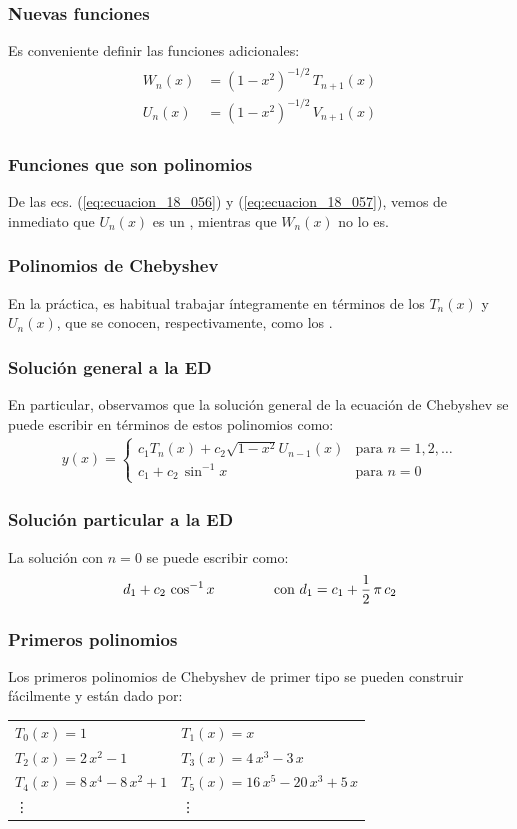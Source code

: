 \documentclass[12pt]{beamer}
\begin{document}
\begin{frame}
\frametitle{Nuevas funciones}
Es conveniente definir las funciones adicionales:
\pause
\begin{align}
\begin{aligned}
W_{n} (x) &= (1 - x^{2})^{-1/2} \, T_{n+1} (x) \\[0.5em]
U_{n} (x) &= (1 - x^{2})^{-1/2} \, V_{n+1} (x)
\end{aligned}
\label{eq:ecuacion_18_058}
\end{align}
\end{frame}
\begin{frame}
\frametitle{Funciones que son polinomios}
De las ecs. (\ref{eq:ecuacion_18_056}) y (\ref{eq:ecuacion_18_057}), vemos de inmediato que $U_{n}(x)$ es un , mientras que $W_{n}(x)$ no lo es.
\end{frame}
\begin{frame}
\frametitle{Polinomios de Chebyshev}
En la práctica, es habitual trabajar íntegramente en términos de los $T_{n} (x)$ y $U_{n} (x)$, que se conocen, respectivamente, como los .
\end{frame}
\begin{frame}
\frametitle{Solución general a la ED}
En particular, observamos que la solución general de la ecuación de Chebyshev se puede escribir en términos de estos polinomios como:
\pause
\begin{align*}
y (x) = \begin{cases}
c_{1} T_{n} (x) {+} c_{2} \sqrt{1 {-} x^{2}} U_{n-1} (x) & \!\!\!\! \mbox{para } n {=} 1, 2, \ldots \\[0.5em]
c_{1} + c_{2} \, \sin^{-1} x & \mbox{para  } n = 0
\end{cases}
\end{align*}
\end{frame}
\begin{frame}
\frametitle{Solución particular a la ED}
La solución con $n = 0$ se puede escribir como:
\pause
\begin{align*}
d_{1} + c_{2} \, \cos^{-1} x \hspace{1.5cm} \mbox{con  } d_{1} = c_{1} + \dfrac{1}{2} \, \pi \, c_{2}
\end{align*}
\end{frame}
\begin{frame}
\frametitle{Primeros polinomios}
Los primeros polinomios de Chebyshev de primer tipo se pueden construir fácilmente y están dado por:
\pause
\begin{table}[H]
\centering
\fontsize{14}{14}\selectfont
\begin{tabular}{p{4.45cm} p{5.5cm}}
$T_{0} (x) {=} 1$ & $T_{1} (x) {=} x$ \\[0.25em]
$T_{2} (x) {=} 2 \, x^{2} {-} 1$ & $T_{3} (x) {=} 4 \, x^{3} {-} 3 \, x$ \\[0.25em]
$T_{4} (x) {=} 8 \, x^{4} {-} 8 \, x^{2} {+} 1$ & $T_{5} (x) {=} 16 \, x^{5} {-} 20 \, x^{3} {+} 5 \, x$ \\
\vdots & \vdots
\end{tabular}
\end{table}
\end{frame}
\end{document}

